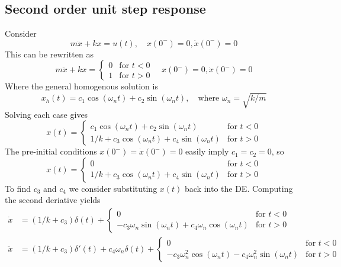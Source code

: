 \documentclass{report}
\begin{document}
\subsection{Second order unit step response}
Consider
\begin{equation*}
m\ddot{x}+kx=u(t),\quad x(0^-)=0,\dot{x}(0^-)=0
\end{equation*}
This can be rewritten as
\begin{equation*}
m\ddot{x}+kx=\begin{cases}
0&\text{for }t<0\\
1&\text{for }t>0
\end{cases}\quad x(0^-)=0,\dot{x}(0^-)=0
\end{equation*}
Where the general homogenous solution is
\begin{equation*}
x_h(t)=c_1\cos(\omega_nt)+c_2\sin(\omega_nt),\quad\text{where }\omega_n=\sqrt{k/m}
\end{equation*}
Solving each case gives
\begin{equation*}
x(t)=\begin{cases}
c_1\cos(\omega_nt)+c_2\sin(\omega_nt)&\text{for }t<0\\
1/k+c_3\cos(\omega_nt)+c_4\sin(\omega_nt)&\text{for }t>0
\end{cases}
\end{equation*}
The pre-initial conditions $x(0^-)=\dot{x}(0^-)=0$ easily
imply $c_1=c_2=0$, so
\begin{equation*}
x(t)=\begin{cases}
0&\text{for }t<0\\
1/k+c_3\cos(\omega_nt)+c_4\sin(\omega_nt)&\text{for }t>0
\end{cases}
\end{equation*}
To find $c_3$ and $c_4$ we consider substituting $x(t)$ back into the DE. Computing the second deriative yields
\begin{align*}
\dot{x}&=(1/k+c_3)\delta(t)+\begin{cases}
0&\text{for }t<0\\
-c_3\omega_n\sin(\omega_nt)+c_4\omega_n\cos(\omega_nt)&\text{for }t>0
\end{cases}\\
\ddot{x}&=(1/k+c_3)\delta'(t)+c_4\omega_n\delta(t)+
\begin{cases}
0&\text{for }t<0\\
-c_3\omega^2_n\cos(\omega_nt)-c_4\omega^2_n\sin(\omega_nt)&\text{for }t>0\end{cases}
\end{align*}
\end{document}
